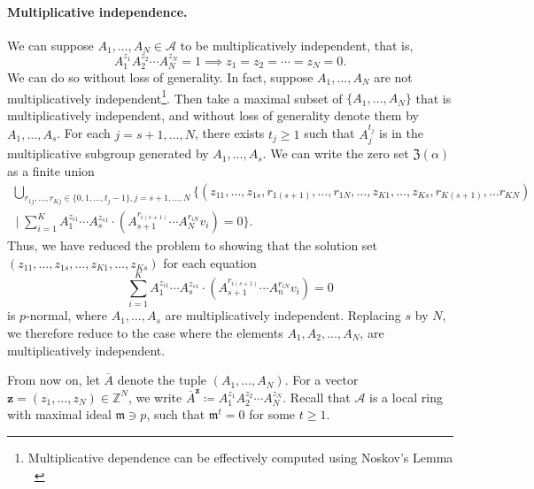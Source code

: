 \documentclass[letterpaper, 11pt, thm-restate]{article}
\numberwithin{equation}{section}
\newcommand{\Z}{\mathbb{Z}}
\newcommand{\mA}{\mathcal{A}}
\newcommand{\mZ}{\mathfrak{Z}}
\newcommand{\bz}{\boldsymbol{z}}
\newcommand{\oA}{\overline{A}}
\newcommand{\frm}{\mathfrak{m}}
\theoremstyle{definition}
\theoremstyle{definition}
\theoremstyle{definition}
\begin{document}
\paragraph{Multiplicative independence.} 
We can suppose $A_1, \ldots, A_N \in \mA$ to be multiplicatively independent, that is, 
\[
A_1^{z_1} A_2^{z_2} \cdots A_N^{z_N} = 1 \implies z_1 = z_2 = \cdots = z_N = 0.
\]
We can do so without loss of generality.
In fact, suppose $A_1, \ldots, A_N$ are not multiplicatively independent\footnote{Multiplicative dependence can be effectively computed using Noskov's Lemma \cite{noskov1982conjugacy}~\cite[Proposition~2.4]{baumslag1994algorithmic}}.
Then take a maximal subset of $\{A_1, \ldots, A_N\}$ that is multiplicatively independent, and without loss of generality denote them by $A_1, \ldots, A_s$.
For each $j = s+1, \ldots, N$, there exists $t_j \geq 1$ such that $A_j^{t_j}$ is in the multiplicative subgroup generated by $A_1, \ldots, A_s$.
We can write the zero set $\mZ(\alpha)$ as a finite union
\begin{multline*}
\bigcup_{r_{1j}, \ldots, r_{Kj} \in \{0, 1, \ldots, t_{j}-1\}, j = s+1, \ldots, N} \Bigg\{ (z_{11}, \ldots, z_{1s}, r_{1(s+1)}, \ldots, r_{1N}, \ldots, z_{K1}, \ldots, z_{Ks}, r_{K(s+1)}, \ldots r_{KN}) \\
\;\Bigg|\; \sum_{i = 1}^K A_1^{z_{i1}} \cdots A_s^{z_{s1}} \cdot \left(A_{s+1}^{r_{i(s+1)}} \cdots A_N^{r_{iN}} v_i \right) = 0 \Bigg\}.
\end{multline*}
Thus, we have reduced the problem to showing that the solution set $(z_{11}, \ldots, z_{1s}, \ldots, z_{K1}, \ldots, z_{Ks})$ for each equation 
\[
\sum_{i = 1}^K A_1^{z_{i1}} \cdots A_s^{z_{s1}} \cdot \left(A_{s+1}^{r_{i(s+1)}} \cdots A_n^{r_{iN}} v_i \right) = 0
\]
is $p$-normal, where $A_1, \ldots, A_s$ are multiplicatively independent.
Replacing $s$ by $N$, we therefore reduce to the case where the elements $A_1, A_2, \ldots, A_N$, are multiplicatively independent.

\bigskip

From now on, let $\oA$ denote the tuple $(A_1, \ldots, A_N)$.
For a vector $\bz = (z_1, \ldots, z_N) \in \Z^N$, we write
$
\oA^{\bz} \coloneqq A_1^{z_1} A_2^{z_2} \cdots A_N^{z_N}
$.
Recall that $\mA$ is a local ring with maximal ideal $\frm \ni p$, such that $\frm^t = 0$ for some $t \geq 1$.
\end{document}
